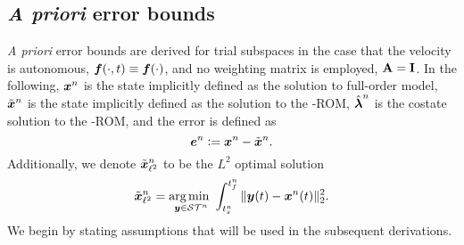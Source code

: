 %

\subsection{\textit{A priori} error bounds}
\textit{A priori} error bounds are derived for \spatialAcronym trial subspaces in the case that the velocity is autonomous, $\boldsymbol f(\cdot,t) \equiv \boldsymbol f(\cdot)$, and no weighting matrix is employed, $\mathbf{A} = \mathbf{I}$.
In the following,  ${\boldsymbol x}^{n}$ is the state implicitly defined as the solution to full-order model, $\tilde{\boldsymbol x}^{n}$ is the state implicitly defined as the solution to the \methodAcronym-ROM, $\hat{\boldsymbol \lambda}^{n}$ is the costate solution to the \methodAcronym-ROM, and the error is defined as
$$\boldsymbol e^{n} \vcentcolon= {\boldsymbol x}^{n} - \tilde{\boldsymbol x}^{n}.$$
Additionally, we denote $\tilde{\boldsymbol x}_{\ell^2}^{n}$ to be the $L^2$ optimal solution
$$\tilde{\boldsymbol x}_{\ell^2}^{n} = \underset{\boldsymbol y \in
\mathcal{ ST }^n}{\text{arg}\,\text{min } } \int_{t_s^{n}}^{t_f^{n}} \|  \boldsymbol y(t) - {\boldsymbol x}^{n}(t)  \|_2^2.$$ 
We begin by stating assumptions that will be used in the subsequent derivations.

